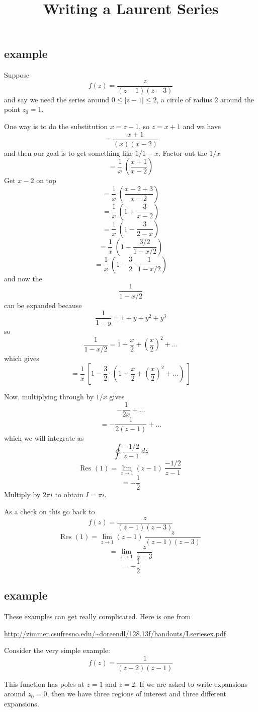 \documentclass[11pt, oneside]{article}   	%
\title{Writing a Laurent Series}
\date{}							%
\begin{document}
\maketitle
\Large
\subsection*{example}
Suppose
\[ f(z) = \frac{z}{(z-1)(z-3)} \]
and say we need the series around $0 \le | z - 1 | \le 2$, a circle of radius $2$ around the point $z_0 = 1$.

One way is to do the substitution $x = z - 1$, so $z = x + 1$ and we have
\[  = \frac{x+1}{(x)(x-2)} \]
and then our goal is to get something like $1/1-x$.  Factor out the $1/x$
\[ = \frac{1}{x} \ ( \frac{x+1}{x-2} ) \]
Get $x - 2$ on top
\[ = \frac{1}{x} \ ( \frac{x - 2 +  3}{x - 2} ) \]
\[ = \frac{1}{x} \ ( 1 + \frac{ 3}{x-2} ) \]
\[ = \frac{1}{x} \ ( 1 - \frac{ 3}{2-x} ) \]
\[ = \frac{1}{x} \ ( 1 - \frac{ 3/2}{1 - x/2} ) \]
\[ = \frac{1}{x} \ ( 1 - \frac{3}{2} \cdot \frac{1}{1 - x/2} ) \]
and now the 
\[ \frac{1}{1 - x/2} \]
can be expanded because
\[ \frac{1}{1 - y} = 1 + y + y^2 + y^3 \]
so 
\[ \frac{1}{1 - x/2} = 1 + \frac{x}{2} + (\frac{x}{2} )^2 + \dots \]
which gives
\[ = \frac{1}{x} \ [ 1 - \frac{3}{2} \cdot (1 + \frac{x}{2} + (\frac{x}{2} )^2 + \dots) \ ] \]

Now, multiplying through by $1/x$ gives
\[ -\frac{1}{2x} + \dots \]
\[ = -\frac{1}{2(z-1)} + \dots \]
which we will integrate as
\[ \oint \frac{-1/2}{z-1} \ dz \]
\[ \text{Res }(1) = \lim_{z \rightarrow 1} (z-1) \ \frac{-1/2}{z-1} \]
\[ = -\frac{1}{2} \]
Multiply by $2 \pi i$ to obtain $I = \pi i$.

As a check on this go back to 
\[ f(z) = \frac{z}{(z-1)(z-3)} \]
\[ \text{Res }(1) = \lim_{z \rightarrow 1} (z-1) \ \frac{z}{(z-1)(z-3)} \]
\[ =  \lim_{z \rightarrow 1} \ \frac{z}{z-3} \]
\[ = -\frac{1}{2} \]

\subsection*{example}
These examples can get really complicated.  Here is one from

\url{http://zimmer.csufresno.edu/~doreendl/128.13f/handouts/Lseriesex.pdf}

Consider the very simple example:
\[ f(z) = \frac{1}{(z-2)(z-1)} \]

This function has poles at $z = 1$ and $z = 2$.  If we are asked to write expansions around $z_0 = 0$, then we have three regions of interest and three different expansions.
\end{document}
